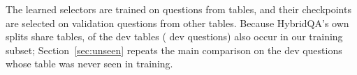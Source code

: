 The learned selectors are trained on \nTrain{} questions from \nTrainTables{} tables, and their checkpoints are selected on \nVal{} validation questions from \nValTables{} other tables. Because HybridQA's own splits share tables, \testTablesInTrain{} of the \nTestTables{} dev tables (\testQuestionsWithTrainTable{} dev questions) also occur in our training subset; Section~\ref{sec:unseen} repeats the main comparison on the dev questions whose table was never seen in training.
